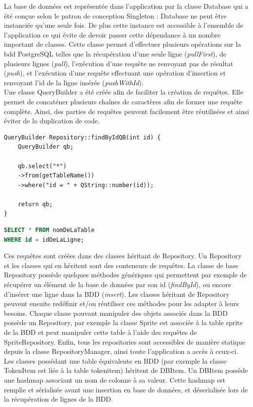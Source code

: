 La base de données est représentée dans l'application par la classe Database qui a été conçue selon le patron de conception Singleton : Database ne peut être instanciée qu'une seule fois. De plus cette instance est accessible à l'ensemble de l'application ce qui évite de devoir passer cette dépendance à un nombre important de classes. Cette classe permet d'effectuer plusieurs opérations sur la bdd PostgreSQL telles que la récupération d'une seule ligne (\emph{pullFirst}), de plusieurs lignes (\emph{pull}), l'exécution d'une requête ne renvoyant pas de résultat (\emph{push}), et l'exécution d'une requête effectuant une opération d'insertion et renvoyant l'id de la ligne insérée (\emph{pushWithId}).\\

Une classe QueryBuilder a été créée afin de faciliter la création de requêtes. Elle permet de concaténer plusieurs chaînes de caractères afin de former une requête complète. Ainsi, des parties de requêtes peuvent facilement être réutilisées et ainsi éviter de la duplication de code.

\begin{lstlisting}[caption=Exemple d'utilisation de QueryBuilder]
QueryBuilder Repository::findByIdQB(int id) {
    QueryBuilder qb;

    qb.select("*")
    ->from(getTableName())
    ->where("id = " + QString::number(id));

    return qb;
}
\end{lstlisting}

\begin{lstlisting}[language=SQL,caption=Equivalent en SQL de la requête créée avec le QueryBuilder]
SELECT * FROM nomDeLaTable 
WHERE id = idDeLaLigne;
\end{lstlisting}

Ces requêtes sont créées dans des classes héritant de Repository. Un Repository et les classes qui en héritent sont des conteneurs de requêtes. La classe de base Repository possède quelques méthodes génériques qui permettent par exemple de récupérer un élément de la base de données par son id (\emph{findById}), ou encore d'insérer une ligne dans la BDD (\emph{insert}). Les classes héritant de Repository peuvent ensuite redéfinir et/ou réutiliser ces méthodes pour les adapter à leurs besoins. Chaque classe pouvant manipuler des objets associés dans la BDD possède un Repository, par exemple la classe Sprite est associée à la table sprite de la BDD et peut manipuler cette table à l'aide des requêtes de SpriteRepository. Enfin, tous les repositories sont accessibles de manière statique depuis la classe RepositoryManager, ainsi toute l'application a accès à ceux-ci.\\

Les classes possédant une table équivalente en BDD (par exemple la classe TokenItem est liée à la table tokenitem) héritent de DBItem. Un DBItem possède une hashmap associant un nom de colonne à sa valeur. Cette hashmap est remplie et sérialisée avant une insertion en base de données, et déserialisée lors de la récupération de lignes de la BDD.